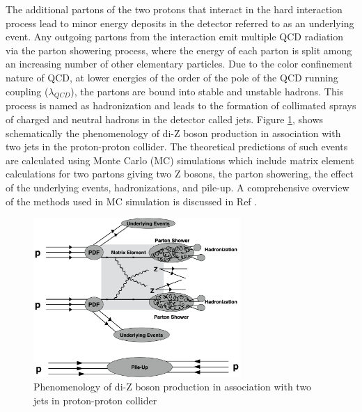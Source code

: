 The additional partons of the two protons that interact in the hard interaction process lead to minor energy deposits in the detector referred to as an underlying event. Any outgoing partons from the interaction emit multiple QCD radiation via the parton showering process, where the energy of each parton is split among an increasing number of other elementary particles. Due to the color confinement nature of QCD, at lower energies of the order of the pole of the QCD running coupling ($\lambda_{QCD}$), the partons are bound into stable and unstable hadrons. This process is named as hadronization and leads to the formation of collimated sprays of charged and neutral hadrons in the detector called jets. Figure \ref{fig:ColliderPheno}, shows schematically the phenomenology of di-Z boson production in association with two jets in the proton-proton collider. The theoretical predictions of such events are calculated using Monte Carlo (MC) simulations which include matrix element calculations for two partons giving two Z bosons, the parton showering, the effect of the underlying events, hadronizations, and pile-up. A comprehensive overview of the methods used in MC simulation is discussed in Ref \cite{EventGenerator}.  

\begin{figure}
\centering
    \includegraphics[width=0.7\textwidth] {figures/Theory/ColliderPheno.pdf}\hspace{1cm}
    \caption{Phenomenology of di-Z boson production in association with two jets in proton-proton collider}
\label{fig:ColliderPheno}
\end{figure}
